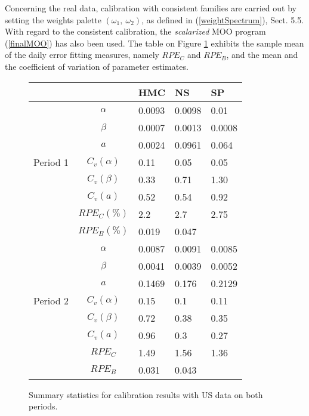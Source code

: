 Concerning the real data, calibration with consistent families are
carried out by setting the weights palette $(\omega_1,~ \omega_2)$, as
defined in (\ref{weightSpectrum}), Sect. 5.5. With regard to the
consistent calibration, the {\sl scalarized} MOO program (\ref{finalMOO}) has
also been used. The table on Figure \ref{RealResults} exhibits 
the sample mean of the daily error fitting measures, namely $RPE_C$
and $RPE_B$, and the mean and the coefficient of variation of
parameter estimates.  

\begin{figure}[h!]
\caption{Summary statistics for calibration results with US data on both periods.
\label{RealResults}} 
\begin{center}
\begin{tabular}{|c|c|lll|}
\hline\hline
& & HMC & NS & SP \\
\hline 
 & $\alpha$ &  0.0093  & 0.0098 & 0.01\\
  & $\beta$ &  0.0007  & 0.0013  & 0.0008\\
 & $a$ & 0.0024 & 0.0961 & 0.064\\
{\sc Period 1}& $C_v(\alpha)$ & 0.11 & 0.05 & 0.05\\
 & $C_v(\beta)$ & 0.33 & 0.71 & 1.30\\
& $C_v(a)$ & 0.52 & 0.54 & 0.92\\
 &  $RPE_C (\%)$ & 2.2 & 2.7 & 2.75\\ 
 &  $RPE_B (\%)$ & 0.019 & 0.047 & \\
\hline
 & $\alpha$ & 0.0087 & 0.0091 & 0.0085\\
  & $\beta$ & 0.0041  & 0.0039 & 0.0052\\
 & $a$ & 0.1469 & 0.176 & 0.2129\\
{\sc Period 2} & $C_v(\alpha)$ & 0.15 & 0.1 & 0.11 \\
& $C_v(\beta)$ & 0.72 & 0.38 & 0.35\\
 & $C_v(a)$ & 0.96 & 0.3 & 0.27\\
 &  $RPE_C$ & 1.49 & 1.56 & 1.36\\
 &  $RPE_B$ & 0.031 & 0.043 &\\
\hline 
\end{tabular}
\end{center}
\end{figure}

